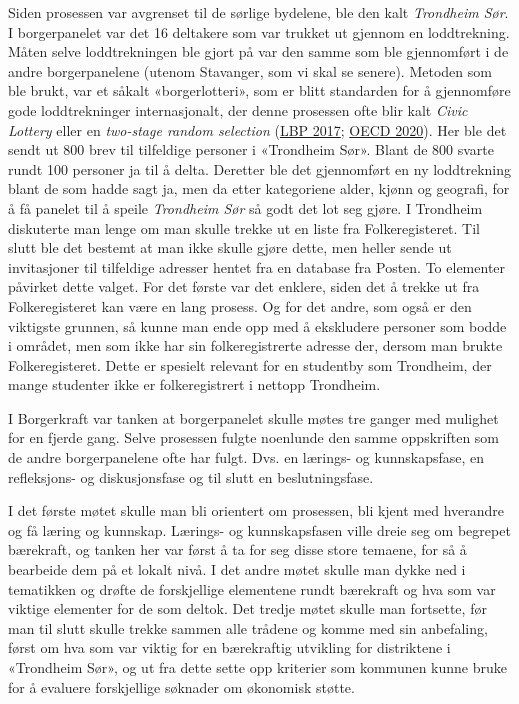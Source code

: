 \documentclass[
  12pt,
  a4paper, 12pt]{article}
\begin{document}
Siden prosessen var avgrenset til de sørlige bydelene, ble den kalt \emph{Trondheim Sør}. I borgerpanelet var det 16 deltakere som var trukket ut gjennom en loddtrekning. Måten selve loddtrekningen ble gjort på var den samme som ble gjennomført i de andre borgerpanelene (utenom Stavanger, som vi skal se senere). Metoden som ble brukt, var et såkalt «borgerlotteri», som er blitt standarden for å gjennomføre gode loddtrekninger internasjonalt, der denne prosessen ofte blir kalt \emph{Civic Lottery} eller en \emph{two-stage random selection} (\protect\hyperlink{ref-mass_lbp_how_2017}{LBP 2017}; \protect\hyperlink{ref-oecd_innovative_2020}{OECD 2020}). Her ble det sendt ut 800 brev til tilfeldige personer i «Trondheim Sør». Blant de 800 svarte rundt 100 personer ja til å delta. Deretter ble det gjennomført en ny loddtrekning blant de som hadde sagt ja, men da etter kategoriene alder, kjønn og geografi, for å få panelet til å speile \emph{Trondheim Sør} så godt det lot seg gjøre. I Trondheim diskuterte man lenge om man skulle trekke ut en liste fra Folkeregisteret. Til slutt ble det bestemt at man ikke skulle gjøre dette, men heller sende ut invitasjoner til tilfeldige adresser hentet fra en database fra Posten. To elementer påvirket dette valget. For det første var det enklere, siden det å trekke ut fra Folkeregisteret kan være en lang prosess. Og for det andre, som også er den viktigste grunnen, så kunne man ende opp med å ekskludere personer som bodde i området, men som ikke har sin folkeregistrerte adresse der, dersom man brukte Folkeregisteret. Dette er spesielt relevant for en studentby som Trondheim, der mange studenter ikke er folkeregistrert i nettopp Trondheim.

I Borgerkraft var tanken at borgerpanelet skulle møtes tre ganger med mulighet for en fjerde gang. Selve prosessen fulgte noenlunde den samme oppskriften som de andre borgerpanelene ofte har fulgt. Dvs. en lærings- og kunnskapsfase, en refleksjons- og diskusjonsfase og til slutt en beslutningsfase.

I det første møtet skulle man bli orientert om prosessen, bli kjent med hverandre og få læring og kunnskap. Lærings- og kunnskapsfasen ville dreie seg om begrepet bærekraft, og tanken her var først å ta for seg disse store temaene, for så å bearbeide dem på et lokalt nivå. I det andre møtet skulle man dykke ned i tematikken og drøfte de forskjellige elementene rundt bærekraft og hva som var viktige elementer for de som deltok. Det tredje møtet skulle man fortsette, før man til slutt skulle trekke sammen alle trådene og komme med sin anbefaling, først om hva som var viktig for en bærekraftig utvikling for distriktene i «Trondheim Sør», og ut fra dette sette opp kriterier som kommunen kunne bruke for å evaluere forskjellige søknader om økonomisk støtte.
\end{document}

